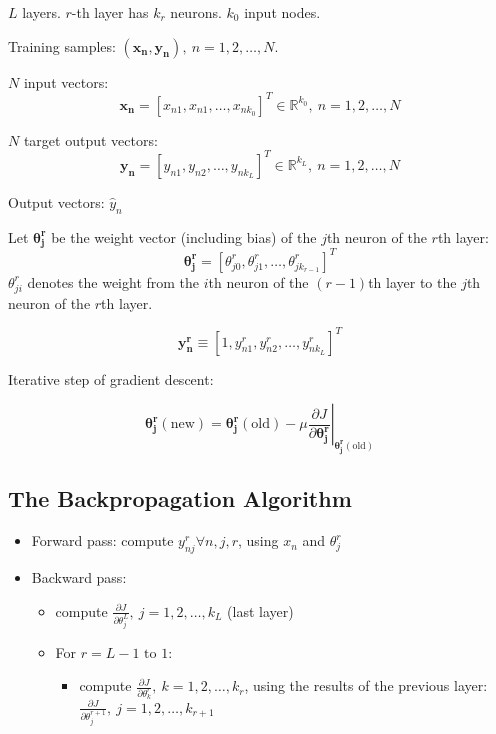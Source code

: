 \documentclass{report}
\begin{document}
$L$ layers.
$r$-th layer has $k_r$ neurons.
$k_0$ input nodes.

Training samples: $(\symbf{x_n}, \symbf{y_n}),\ n=1, 2, \ldots, N$.

$N$ input vectors:
\[\symbf{x_n} = [x_{n 1}, x_{n 1}, \ldots , x_{n k_0}]^T \in \mathbb{R}^{k_0},\ n = 1, 2, \ldots, N\]

$N$ target output vectors:
\[\symbf{y_n} = [y_{n 1}, y_{n 2}, \ldots , y_{n k_L}]^T \in \mathbb{R}^{k_L},\ n = 1, 2, \ldots, N\]

Output vectors: $\hat y_n$

Let $\symbf{\theta_j^r}$ be the weight vector (including bias) of the $j$th neuron of the $r$th layer:
\[\symbf{\theta_j^r} = [\theta_{j0}^r, \theta_{j1}^r, \ldots, \theta_{jk_{r-1}}^r]^T\]
$\theta_{ji}^r$ denotes the weight from the $i$th neuron of the $(r-1)$th layer to the $j$th neuron of the $r$th layer.

\[\symbf{y_n^r} \equiv [1, y_{n 1}^r, y_{n 2}^r, \ldots, y_{n k_L}^r]^T\]

Iterative step of gradient descent:

\[\symbf{\theta_j^r}(\text{new}) = \symbf{\theta_j^r}(\text{old}) - \mu \left.\frac{\partial J}{\partial \symbf{\theta_j^r}} \right|_{\symbf{\theta_j^r}(\text{old})}\]

\subsection*{The Backpropagation Algorithm}

\begin{mdframed}
\begin{itemize}
	\item Forward pass: compute $y_{nj}^r \forall n, j, r$, using $x_n$ and $\theta_j^r$ 
	\item Backward pass:
	\begin{itemize}
		\item compute $\frac{\partial J}{\partial \theta_j^L},\ j=1, 2, \ldots, k_L$ (last layer)
		\item For $r = L-1 \text{ to } 1$:
		\begin{itemize}
			\item compute $\frac{\partial J}{\partial \theta_k^r},\ k=1, 2, \ldots, k_r$, using the results of the previous layer: $\frac{\partial J}{\partial \theta_j^{r+1}},\ j=1, 2, \ldots, k_{r+1}$
		\end{itemize}
	\end{itemize}
\end{itemize}
\end{mdframed}
\end{document}
